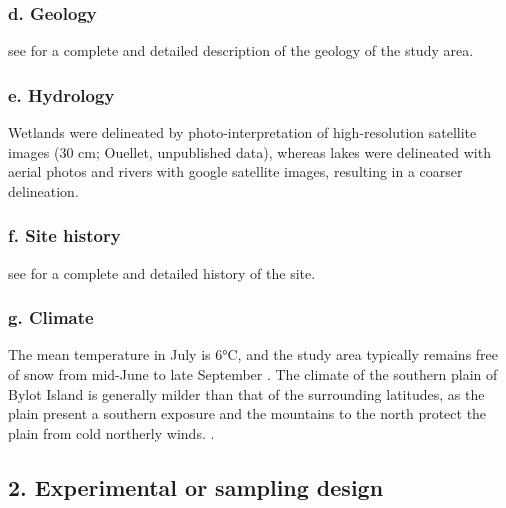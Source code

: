 \documentclass[a4paper,twoside,12pt]{article}
\begin{document}
            	\subsubsection*{d. Geology} see \citet{klassen1993} for a complete and detailed description of the geology of the study area.
            	\subsubsection*{e. Hydrology} Wetlands were delineated by photo-interpretation of high-resolution satellite images (30 cm; Ouellet, unpublished data), whereas lakes were delineated with aerial photos and rivers with google satellite images, resulting in a coarser delineation.
            	\subsubsection*{f. Site history} see \citet{gauthier2024a, gauthier2024b}  for a complete and detailed history of the site.
            	\subsubsection*{g. Climate} The mean temperature in July is 6°C, and the study area typically remains free of snow from mid-June to late September \citep{gauthier2013}. The climate of the southern plain of Bylot Island is generally milder than that of the surrounding latitudes, as the plain present a southern exposure and the mountains to the north protect the plain from cold northerly winds. \citep{gauthier2024a}.
 \newpage
       
      	\subsection*{2. Experimental or sampling design}
\end{document}

